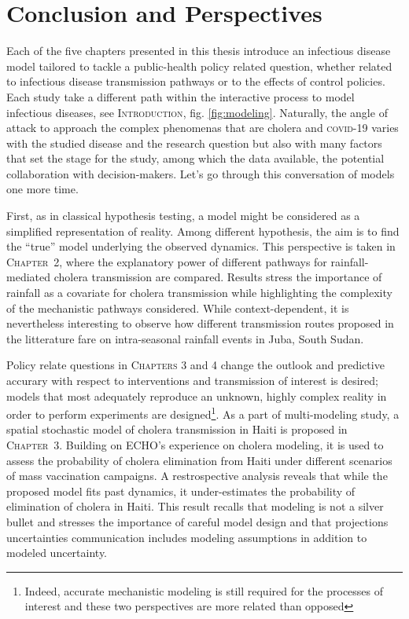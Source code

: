 \chapter*{Conclusion and Perspectives}
Each of the five chapters presented in this thesis introduce an infectious disease model tailored to tackle a public-health policy related question, whether related to infectious disease transmission pathways or to the effects of control policies. Each study take a different path within the interactive process to model infectious diseases, see \textsc{Introduction}, fig. \ref{fig:modeling}. Naturally, the angle of attack to approach the complex phenomenas that are cholera and \textsc{covid}-19 varies with the studied disease and the research question but also with many factors that set the stage for the study, among which \eg the data available, the potential collaboration with decision-makers. Let's go through this conversation of models one more time.

First, as in classical hypothesis testing, a model might be considered as a simplified representation of reality. Among different hypothesis, the aim is to find the ``true'' model underlying the observed dynamics. This perspective is taken in \textsc{Chapter~2}, where the explanatory power of different pathways for rainfall-mediated cholera transmission are compared. Results stress the importance of rainfall as a covariate for cholera transmission while highlighting the complexity of the mechanistic pathways considered. While context-dependent, it is nevertheless interesting to observe how different transmission routes proposed in the litterature fare on intra-seasonal rainfall events in Juba, South Sudan.

Policy relate questions in \textsc{Chapters 3} and 4 change the outlook and predictive accurary with respect to interventions and transmission of interest is desired; models that most adequately reproduce an unknown, highly complex reality in order to perform experiments are designed\footnote{Indeed, accurate mechanistic modeling is still required for the processes of interest and these two perspectives are more related than opposed}. As a part of multi-modeling study, a spatial stochastic model of cholera transmission in Haiti is proposed in \textsc{Chapter~3}. Building on ECHO's experience on cholera modeling, it is used to assess the probability of cholera elimination from Haiti under different scenarios of mass vaccination campaigns. A restrospective analysis reveals that while the proposed model fits past dynamics, it under-estimates the probability of elimination of cholera in Haiti. This result recalls that modeling is not a silver bullet and stresses the importance of careful model design and that projections uncertainties communication includes modeling assumptions in addition to modeled uncertainty.


